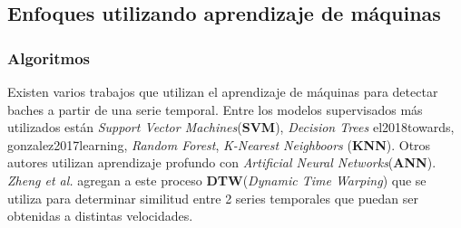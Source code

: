 	\subsection{Enfoques utilizando aprendizaje de máquinas}
		\subsubsection{Algoritmos}
			Existen varios trabajos que utilizan el aprendizaje de máquinas para detectar baches a partir de una serie temporal. Entre los modelos
			supervisados más utilizados están \emph{Support Vector Machines}(\textbf{SVM}), \emph{Decision Trees}\brackcite
			{el2018towards, gonzalez2017learning}, \emph{Random Forest}, \emph{K-Nearest Neighboors}
			(\textbf{KNN}). Otros autores utilizan aprendizaje profundo con
			\emph{Artificial Neural Networks}(\textbf{ANN}).
			\emph{Zheng et al.} agregan a este proceso \textbf{DTW}(\emph{Dynamic Time Warping}) que se utiliza
			para determinar similitud entre 2 series temporales que puedan ser obtenidas a distintas velocidades.

